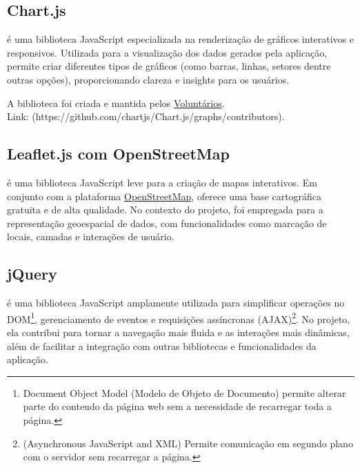 \subsection{Chart.js}
\par {} é uma biblioteca JavaScript especializada na renderização de gráficos interativos e responsivos. Utilizada para a visualização dos dados gerados pela aplicação, permite criar diferentes tipos de gráficos (como barras, linhas, setores dentre outras opções), proporcionando clareza e insights para os usuários.
\par A biblioteca foi criada e mantida pelos \href{https://github.com/chartjs/Chart.js/graphs/contributors}{Voluntários}. \\
Link: (https://github.com/chartjs/Chart.js/graphs/contributors).

\subsection{Leaflet.js com OpenStreetMap}
\par {} é uma biblioteca JavaScript leve para a criação de mapas interativos. Em conjunto com a plataforma \href{https://www.openstreetmap.org/#map=7/-26.613/-50.746}{OpenStreetMap}, oferece uma base cartográfica gratuita e de alta qualidade. No contexto do projeto, foi empregada para a representação geoespacial de dados, com funcionalidades como marcação de locais, camadas e interações de usuário.

\subsection{jQuery}\label{jQuery}
\par {} é uma biblioteca JavaScript amplamente utilizada para simplificar operações no DOM\footnote{Document Object Model (Modelo de Objeto de Documento) permite alterar parte do conteudo da página web sem a necessidade de recarregar toda a página.}, gerenciamento de eventos e requisições assíncronas (AJAX)\footnote{(Asynchronous JavaScript and XML) Permite comunicação em segundo plano com o servidor sem recarregar a página.}. No projeto, ela contribui para tornar a navegação mais fluida e as interações mais dinâmicas, além de facilitar a integração com outras bibliotecas e funcionalidades da aplicação.

